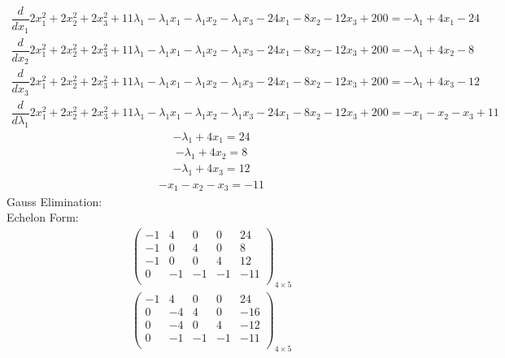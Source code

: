 \documentclass{article}
\begin{document}
\begin{align*}
\dfrac{d}{dx_{1}}2x_{1}^{2} + 2x_{2}^{2} + 2x_{3}^{2} + 11\lambda_{1} - \lambda_{1}x_{1} - \lambda_{1}x_{2} - \lambda_{1}x_{3} - 24x_{1} - 8x_{2} - 12x_{3} + 200=-\lambda_{1} + 4x_{1} - 24\end{align*}
\begin{align*}
\dfrac{d}{dx_{2}}2x_{1}^{2} + 2x_{2}^{2} + 2x_{3}^{2} + 11\lambda_{1} - \lambda_{1}x_{1} - \lambda_{1}x_{2} - \lambda_{1}x_{3} - 24x_{1} - 8x_{2} - 12x_{3} + 200=-\lambda_{1} + 4x_{2} - 8\end{align*}
\begin{align*}
\dfrac{d}{dx_{3}}2x_{1}^{2} + 2x_{2}^{2} + 2x_{3}^{2} + 11\lambda_{1} - \lambda_{1}x_{1} - \lambda_{1}x_{2} - \lambda_{1}x_{3} - 24x_{1} - 8x_{2} - 12x_{3} + 200=-\lambda_{1} + 4x_{3} - 12\end{align*}
\begin{align*}
\dfrac{d}{d\lambda_{1}}2x_{1}^{2} + 2x_{2}^{2} + 2x_{3}^{2} + 11\lambda_{1} - \lambda_{1}x_{1} - \lambda_{1}x_{2} - \lambda_{1}x_{3} - 24x_{1} - 8x_{2} - 12x_{3} + 200=-x_{1} - x_{2} - x_{3} + 11\end{align*}
\begin{align*}
-\lambda_{1} + 4x_{1}=24\end{align*}
\begin{align*}
-\lambda_{1} + 4x_{2}=8\end{align*}
\begin{align*}
-\lambda_{1} + 4x_{3}=12\end{align*}
\begin{align*}
-x_{1} - x_{2} - x_{3}=-11\end{align*}
Gauss Elimination:\\
Echelon Form:\\
\begin{align*}
\left(
\begin{array}{cccc|c}
-1 & 4 & 0 & 0 & 24\\
-1 & 0 & 4 & 0 & 8\\
-1 & 0 & 0 & 4 & 12\\
0 & -1 & -1 & -1 & -11\\
\end{array}
\right)_{4\times 5}
\end{align*}
\begin{align*}
\left(
\begin{array}{cccc|c}
-1 & 4 & 0 & 0 & 24\\
0 & -4 & 4 & 0 & -16\\
0 & -4 & 0 & 4 & -12\\
0 & -1 & -1 & -1 & -11\\
\end{array}
\right)_{4\times 5}
\end{align*}
\end{document}
